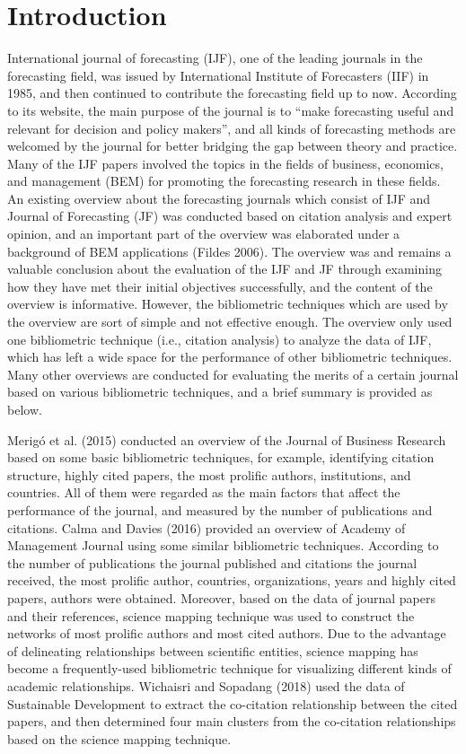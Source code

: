 \documentclass[11pt,a4paper]{elsarticle} %
\begin{document}
\newpage

\section{Introduction}\label{introduction}

\setlength{\parindent}{2em}International journal of forecasting (IJF),
one of the leading journals in the forecasting field, was issued by
International Institute of Forecasters (IIF) in 1985, and then continued
to contribute the forecasting field up to now. According to its website,
the main purpose of the journal is to ``make forecasting useful and
relevant for decision and policy makers'', and all kinds of forecasting
methods are welcomed by the journal for better bridging the gap between
theory and practice. Many of the IJF papers involved the topics in the
fields of business, economics, and management (BEM) for promoting the
forecasting research in these fields. An existing overview about the
forecasting journals which consist of IJF and Journal of Forecasting
(JF) was conducted based on citation analysis and expert opinion, and an
important part of the overview was elaborated under a background of BEM
applications (Fildes 2006). The overview was and remains a valuable
conclusion about the evaluation of the IJF and JF through examining how
they have met their initial objectives successfully, and the content of
the overview is informative. However, the bibliometric techniques which
are used by the overview are sort of simple and not effective enough.
The overview only used one bibliometric technique (i.e., citation
analysis) to analyze the data of IJF, which has left a wide space for
the performance of other bibliometric techniques. Many other overviews
are conducted for evaluating the merits of a certain journal based on
various bibliometric techniques, and a brief summary is provided as
below.

Merigó et al. (2015) conducted an overview of the Journal of Business
Research based on some basic bibliometric techniques, for example,
identifying citation structure, highly cited papers, the most prolific
authors, institutions, and countries. All of them were regarded as the
main factors that affect the performance of the journal, and measured by
the number of publications and citations. Calma and Davies (2016)
provided an overview of Academy of Management Journal using some similar
bibliometric techniques. According to the number of publications the
journal published and citations the journal received, the most prolific
author, countries, organizations, years and highly cited papers, authors
were obtained. Moreover, based on the data of journal papers and their
references, science mapping technique was used to construct the networks
of most prolific authors and most cited authors. Due to the advantage of
delineating relationships between scientific entities, science mapping
has become a frequently-used bibliometric technique for visualizing
different kinds of academic relationships. Wichaisri and Sopadang (2018)
used the data of Sustainable Development to extract the co-citation
relationship between the cited papers, and then determined four main
clusters from the co-citation relationships based on the science mapping
technique.
\end{document}
